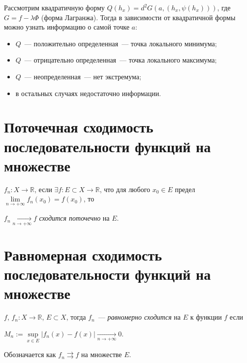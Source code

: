 \documentclass{article}
\begin{document}
        Рассмотрим квадратичную форму $Q(h_x) = d^2 G(a, \left( h_x, \psi (h_x ) \right) )$, где $G = f - \lambda \Phi$ (форма Лагранжа). Тогда в зависимости от квадратичной формы можно узнать информацию о самой точке $a$:
        
        \begin{itemize}
        
            \item $Q$~--- положительно определенная~--- точка локального минимума;
            
            \item $Q$~--- отрицательно определенная~--- точка локального максимума;
            
            \item $Q$~--- неопределенная~--- нет экстремума;
            
            \item в остальных случаях недостаточно информации.
        
        \end{itemize}
        
    \newpage
    
    \section{Поточечная сходимость последовательности функций на множестве }
    
        $f_n : X \rightarrow \mathbb{R}$, если $\exists f : E \subset X \rightarrow \mathbb{R}$, что для любого $x_0 \in E$ предел $\lim\limits_{n \rightarrow +\infty} f_n(x_0) = f(x_0)$, то
        
        $f_n \xrightarrow[n \rightarrow +\infty]{} f$ \textit{сходится поточечно} на $E$.
        
    \newpage
    
    \section{Равномерная сходимость последовательности функций на множестве }
    
        $f$, $f_n : X \rightarrow \mathbb{R}$, $E \subset X$, тогда $f_n$~--- \textit{равномерно сходится} на $E$ к функции $f$ если
        
        $M_n := \sup\limits_{x \in E} \left| f_n(x) - f(x) \right| \xrightarrow[n \rightarrow +\infty]{} 0$.
        
        Обозначается как $f_n \rightrightarrows f$ на множестве $E$.
        
\end{document}
